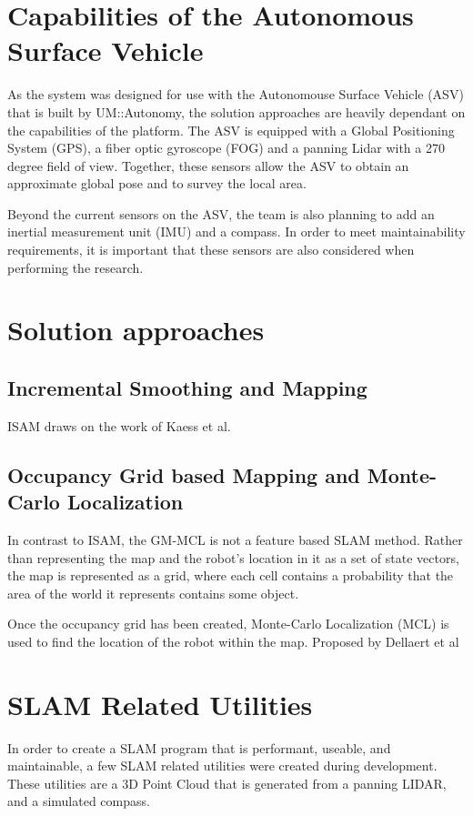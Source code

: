 \documentclass[10pt]{IEEEtran}
\begin{document}
\section{Capabilities of the Autonomous Surface Vehicle}
As the system was designed for use with the Autonomouse Surface Vehicle (ASV) that is
built by UM::Autonomy, the solution approaches are heavily dependant on the capabilities of
the platform.  The ASV is equipped with a Global Positioning System (GPS), a fiber optic 
gyroscope (FOG) and a panning Lidar with a 270 degree field of view.  Together, these sensors
allow the ASV to obtain an approximate global pose and to survey the local area.

Beyond the current sensors on the ASV, the team is also planning to add an inertial 
measurement unit (IMU) and a compass.  In order to meet maintainability requirements, it
is important that these sensors are also considered when performing the research.

\section{Solution approaches}

\subsection{Incremental Smoothing and Mapping}
ISAM draws on the work of Kaess et al.\cite{}
\cite{}

\subsection{Occupancy Grid based Mapping and Monte-Carlo Localization}
In contrast to ISAM, the GM-MCL is not a feature based SLAM method.  Rather than representing
the map and the robot's location in it as a set of state vectors, the map is represented
as a grid, where each cell contains a probability that the area of the world it represents
contains some object.  

Once the occupancy grid has been created, Monte-Carlo Localization (MCL) is used to find the
location of the robot within the map.  Proposed by Dellaert et al \cite{MCL}

\section{SLAM Related Utilities}
In order to create a SLAM program that is performant, useable, and maintainable, a few 
SLAM related utilities were created during development.  These utilities are a 3D Point Cloud
that is generated from a panning LIDAR, and a simulated compass.
\end{document}
